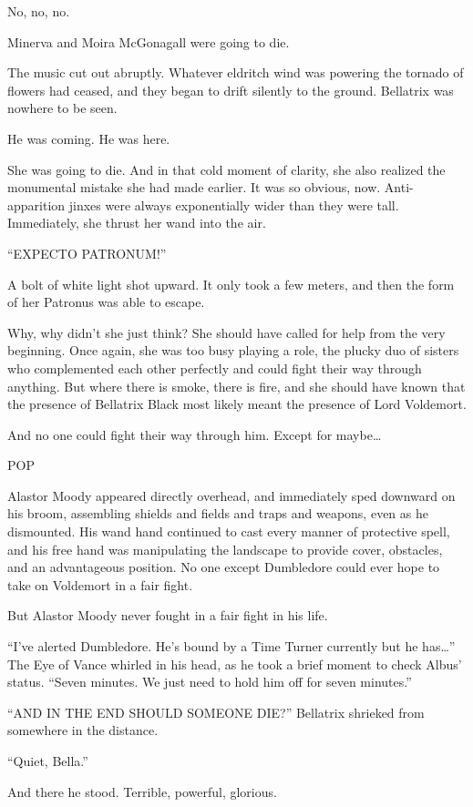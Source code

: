 No, no, no.

Minerva and Moira McGonagall were going to die.

The music cut out abruptly. Whatever eldritch wind was powering the tornado of flowers had ceased, and they began to drift silently to the ground. Bellatrix was nowhere to be seen.

He was coming. He was here.

She was going to die. And in that cold moment of clarity, she also realized the monumental mistake she had made earlier. It was so obvious, now. Anti-apparition jinxes were always exponentially wider than they were tall. Immediately, she thrust her wand into the air.

“EXPECTO PATRONUM!”

A bolt of white light shot upward. It only took a few meters, and then the form of her Patronus was able to escape.

Why, why didn’t she just think? She should have called for help from the very beginning. Once again, she was too busy playing a role, the plucky duo of sisters who complemented each other perfectly and could fight their way through anything. But where there is smoke, there is fire, and she should have known that the presence of Bellatrix Black most likely meant the presence of Lord Voldemort.

And no one could fight their way through him. Except for maybe…

POP

Alastor Moody appeared directly overhead, and immediately sped downward on his broom, assembling shields and fields and traps and weapons, even as he dismounted. His wand hand continued to cast every manner of protective spell, and his free hand was manipulating the landscape to provide cover, obstacles, and an advantageous position. No one except Dumbledore could ever hope to take on Voldemort in a fair fight.

But Alastor Moody never fought in a fair fight in his life.

“I’ve alerted Dumbledore. He’s bound by a Time Turner currently but he has…” The Eye of Vance whirled in his head, as he took a brief moment to check Albus’ status. “Seven minutes. We just need to hold him off for seven minutes.”

“AND IN THE END SHOULD SOMEONE DIE?” Bellatrix shrieked from somewhere in the distance.

“Quiet, Bella.”

And there he stood. Terrible, powerful, glorious.

